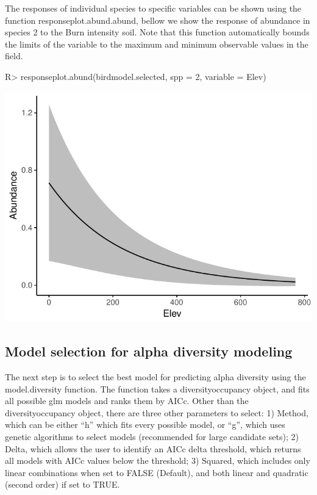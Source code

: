 \documentclass[article]{jss}
\begin{document}
The responses of individual species to specific variables can be shown
using the function responseplot.abund.abund, bellow we show the response
of abundance in species 2 to the Burn intensity soil. Note that this
function automatically bounds the limits of the variable to the maximum
and minimum observable values in the field.

\begin{CodeChunk}

\begin{CodeInput}
R> responseplot.abund(birdmodel.selected, spp = 2, variable = Elev)
\end{CodeInput}


\begin{center}\includegraphics{diversityocc_files/figure-latex/unnamed-chunk-22-1} \end{center}

\end{CodeChunk}

\subsection{Model selection for alpha diversity
modeling}\label{model-selection-for-alpha-diversity-modeling}

The next step is to select the best model for predicting alpha diversity
using the model.diversity function. The function takes a
diversityoccupancy object, and fits all possible glm models and ranks
them by AICc. Other than the diversityoccupancy object, there are three
other parameters to select: 1) Method, which can be either ``h'' which
fits every possible model, or ``g'', which uses genetic algorithms to
select models (recommended for large candidate sets); 2) Delta, which
allows the user to identify an AICc delta threshold, which returns all
models with AICc values below the threshold; 3) Squared, which includes
only linear combinations when set to FALSE (Default), and both linear
and quadratic (second order) if set to TRUE.
\end{document}
